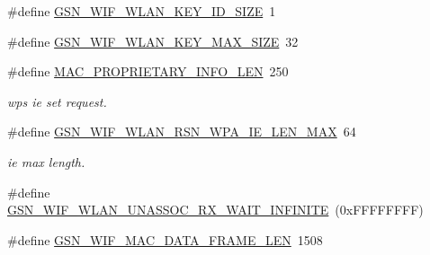 \begin{DoxyCompactItemize}
\item 
\#define \hyperlink{a00677_ga9678201a85ac27c5443dc024f7858e15}{GSN\_\-WIF\_\-WLAN\_\-KEY\_\-ID\_\-SIZE}~1
\item 
\#define \hyperlink{a00677_ga482d5027f475077e97383b1dfabf4508}{GSN\_\-WIF\_\-WLAN\_\-KEY\_\-MAX\_\-SIZE}~32
\item 
\#define \hyperlink{a00677_ga061dde080c4358e4caf65cfb37d5c3cd}{MAC\_\-PROPRIETARY\_\-INFO\_\-LEN}~250
\begin{DoxyCompactList}\small\item\em wps ie set request. \end{DoxyCompactList}\item 
\#define \hyperlink{a00677_gad043f51474c04cc30a14d7d36d0d38f4}{GSN\_\-WIF\_\-WLAN\_\-RSN\_\-WPA\_\-IE\_\-LEN\_\-MAX}~64
\begin{DoxyCompactList}\small\item\em ie max length. \end{DoxyCompactList}\item 
\#define \hyperlink{a00677_ga156c406dfb5900a2fbc4a629ff39b794}{GSN\_\-WIF\_\-WLAN\_\-UNASSOC\_\-RX\_\-WAIT\_\-INFINITE}~(0xFFFFFFFF)
\item 
\#define \hyperlink{a00677_ga32d6df65630d2b7926144dee1c854916}{GSN\_\-WIF\_\-MAC\_\-DATA\_\-FRAME\_\-LEN}~1508
\end{DoxyCompactItemize}
